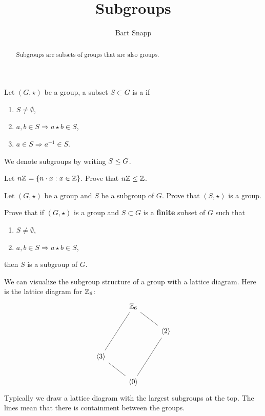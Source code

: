 \documentclass{ximera}
\author{Bart Snapp}
\title{Subgroups}
\begin{document}
\begin{abstract}
  Subgroups are subsets of groups that are also groups. 
\end{abstract}
\maketitle


\begin{definition}
  Let $(G,\star)$ be a group, a subset $S\subset G$ is a  if
  \begin{enumerate}
  \item $S \ne \emptyset$,
  \item $a,b\in S \Rightarrow a\star b\in S$,
  \item $a\in S \Rightarrow a^{-1}\in S$.
  \end{enumerate}
  We denote subgroups by writing $S\leq G$.
\end{definition}


\begin{exercise}
  Let $n\mathbb Z = \{n\cdot x : x\in \mathbb Z\}$. Prove that $n\mathbb Z\leq \mathbb Z$.
\end{exercise}


\begin{exercise}
  Let $(G,\star)$ be a group and $S$ be a subgroup of $G$. Prove that
  $(S,\star)$ is a group.
\end{exercise}

\begin{exercise}
  Prove that if $(G,\star)$ is a group and $S\subset G$ is a \textbf{finite}
  subset of $G$ such that
  \begin{enumerate}
  \item $S \ne \emptyset$,
  \item $a,b\in S \Rightarrow a\star b\in S$,
  \end{enumerate}
  then $S$ is a subgroup of $G$.
\end{exercise}


\begin{example}
  We can visualize the subgroup structure of a group with a lattice
  diagram. Here is the lattice diagram for $\mathbb Z_6$:
  \[
  \begin{tikzcd}
    & \Z_6 \ar[rd,-]  \ar[ldd,-] &       \\
    &       & \<2\> \ar[ldd,-]\\
    \< 3\> \ar[rd,-]&       &       \\   
    & \<0\> &
  \end{tikzcd}
  \]
  Typically we draw a lattice diagram with the largest subgroups at
  the top. The lines mean that there is containment between the groups.
\end{example}
\end{document}
